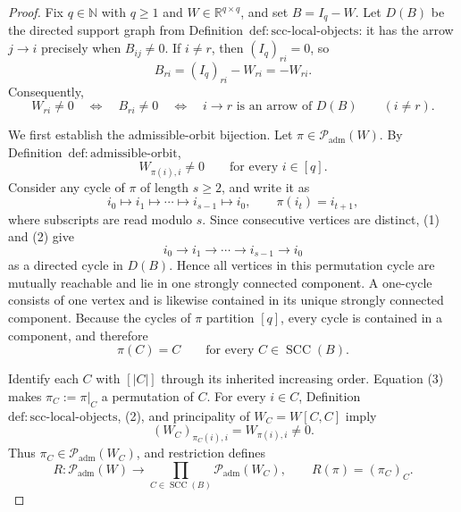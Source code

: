 \documentclass{article}
\begin{document}
\begin{proof}
Fix \(q\in\mathbb N\) with \(q\geq 1\) and \(W\in\mathbb R^{q\times q}\), and set \(B=I_q-W\).  Let \(D(B)\) be the directed support graph from Definition~\(\mathrm{def:scc\text{-}local\text{-}objects}\): it has the arrow \(j\to i\) precisely when \(B_{ij}\neq0\).  If \(i\neq r\), then \((I_q)_{ri}=0\), so
\[
 B_{ri}=(I_q)_{ri}-W_{ri}=-W_{ri}.
\]
Consequently,
\[
 W_{ri}\neq0
 \quad\Longleftrightarrow\quad
 B_{ri}\neq0
 \quad\Longleftrightarrow\quad
 i\to r\text{ is an arrow of }D(B)
 \qquad(i\neq r). \tag{1}
\]

We first establish the admissible-orbit bijection.  Let \(\pi\in\mathcal P_{\mathrm{adm}}(W)\).  By Definition~\(\mathrm{def:admissible\text{-}orbit}\),
\[
 W_{\pi(i),i}\neq0
 \qquad\text{for every }i\in[q]. \tag{2}
\]
Consider any cycle of \(\pi\) of length \(s\geq2\), and write it as
\[
 i_0\longmapsto i_1\longmapsto\cdots
 \longmapsto i_{s-1}\longmapsto i_0,
 \qquad \pi(i_t)=i_{t+1},
\]
where subscripts are read modulo \(s\).  Since consecutive vertices are distinct, (1) and (2) give
\[
 i_0\longrightarrow i_1\longrightarrow\cdots
 \longrightarrow i_{s-1}\longrightarrow i_0
\]
as a directed cycle in \(D(B)\).  Hence all vertices in this permutation cycle are mutually reachable and lie in one strongly connected component.  A one-cycle consists of one vertex and is likewise contained in its unique strongly connected component.  Because the cycles of \(\pi\) partition \([q]\), every cycle is contained in a component, and therefore
\[
 \pi(C)=C
 \qquad\text{for every }C\in\operatorname{SCC}(B). \tag{3}
\]

Identify each \(C\) with \([|C|]\) through its inherited increasing order.  Equation (3) makes \(\pi_C:=\pi|_C\) a permutation of \(C\).  For every \(i\in C\), Definition~\(\mathrm{def:scc\text{-}local\text{-}objects}\), (2), and principality of \(W_C=W[C,C]\) imply
\[
 (W_C)_{\pi_C(i),i}=W_{\pi(i),i}\neq0. \tag{4}
\]
Thus \(\pi_C\in\mathcal P_{\mathrm{adm}}(W_C)\), and restriction defines
\[
 R:\mathcal P_{\mathrm{adm}}(W)
 \longrightarrow
 \prod_{C\in\operatorname{SCC}(B)}
 \mathcal P_{\mathrm{adm}}(W_C),
 \qquad
 R(\pi)=(\pi_C)_C. \tag{5}
\]


\end{proof}
\end{document}
